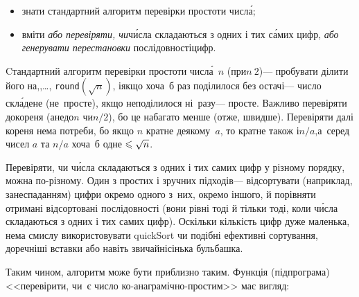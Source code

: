 \documentclass[14pt,a4paper]{extarticle}
\begin{document}
\begin{itemize} 

\item
знати стандартний алгоритм перевірки простоти числ\'{а};

\item
вміти \emph{або перевіряти, чи}\nolinebreak[2] ч\'{и}сла складаються з одних і тих с\'{а}мих цифр, \emph{або генерувати перестановки} послідовності\nolinebreak[3] цифр.

\end{itemize}

Cтандартний алгоритм перевірки простоти числ\'{а}~$n$ (при\nolinebreak[2] $n\>2$)\nolinebreak[3] --- пробувати ділити його на,,\nolinebreak[3] \dots, \verb"round"$(\sqrt{n})$, і\nolinebreak[3] якщо хоча~б раз поділилося без остачі\nolinebreak[3] --- число скл\'{а}дене (не~просте), якщо не\nolinebreak[3] поділилося ні~разу\nolinebreak[3] --- просте. Важливо перевіряти до\nolinebreak[2] кореня (а\nolinebreak[3] не\nolinebreak[2] до\nolinebreak[3] $n$ чи\nolinebreak[2] $n/2$), бо це набагато менше (отже, швидше). Перевіряти далі кореня нема потреби, бо якщо $n$ кратне деякому~$a$, то кратне також і\nolinebreak[2] $n/a$,\linebreak[1] а~серед чисел $a$ та $n/a$ хоча~б одне${}\leqslant\sqrt{n}$. 

Перевіряти, чи ч\'{и}сла складаються з одних і тих самих цифр у різному порядку, можна по-різному. Один з простих і зручних підходів\nolinebreak[3] --- відсортувати (наприклад, за\nolinebreak[3] неспаданням) цифри окремо одного з~них, окремо іншого, й порівняти отримані відсортовані послідовності (вони рівні тоді й тільки тоді, коли ч\'{и}сла складаються з одних і тих самих цифр). Оскільки кількість цифр дуже маленька, нема смислу використовувати quickSort чи подібні ефективні сортування, доречніші вставки або навіть звичайнісінька бульбашка.

Таким чином, алгоритм може бути приблизно таким. 
Функція (підпрограма) <<перевірити, чи~є число ко-анаграмічно-простим>> має вигляд:
\end{document}
